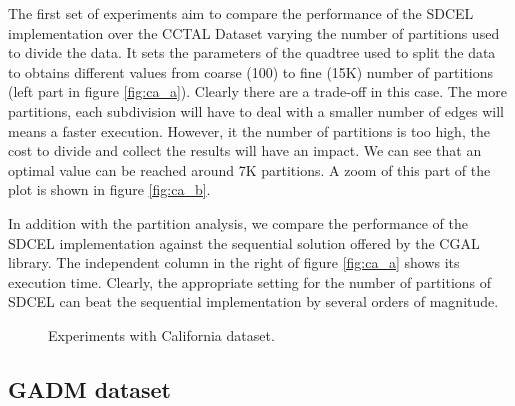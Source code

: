 The first set of experiments aim to compare the performance of the SDCEL implementation over the CCTAL Dataset varying the number of partitions used to divide the data. It sets the parameters of the quadtree used to split the data to obtains different values from coarse (100) to fine (15K) number of partitions (left part in figure \ref{fig:ca_a}).  Clearly there are a trade-off in this case.  The more partitions, each subdivision will have to deal with a smaller number of edges will means a faster execution.  However, it the number of partitions is too high, the cost to divide and collect the results will have an impact.  We can see that an optimal value can be reached around 7K partitions.  A zoom of this part of the plot is shown in figure \ref{fig:ca_b}.

In addition with the partition analysis, we compare the performance of the SDCEL implementation against the sequential solution offered by the CGAL library.  The independent column in the right of figure \ref{fig:ca_a} shows its execution time.  Clearly, the appropriate setting for the number of partitions of SDCEL can beat the sequential implementation by several orders of magnitude.

\begin{figure}[!ht]
    \centering
    \hfill
    \caption{Experiments with California dataset.} \label{fig:ca} 
\end{figure}

\subsection{GADM dataset}

